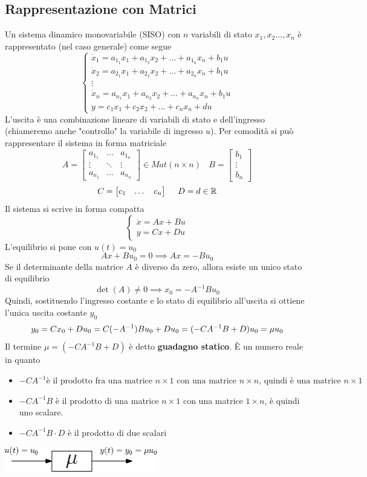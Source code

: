 \documentclass[10pt, letterpaper]{report}
\begin{document}
\subsection{Rappresentazione con Matrici}
Un sistema dinamico monovariabile (SISO) con $n$ variabili di 
stato $x_1,x_2\dots,x_n$ è rappresentato (nel caso generale) come segue
$$\begin{cases}
    \dot{x}_1=a_{1_1}x_1+a_{1_2}x_2+\dots + a_{1_n}x_n+b_1u\\
    \dot{x}_2=a_{2_1}x_1+a_{2_2}x_2+\dots + a_{2_n}x_n+b_1u\\ 
    \vdots \\ 
    \dot{x}_n=a_{n_1}x_1+a_{n_2}x_2+\dots + a_{n_n}x_n+b_1u\\ 
    y=c_1x_1+c_2x_2+\dots + c_nx_n + du
\end{cases}$$
L'uscita è una combinazione lineare di variabili di stato e dell'ingresso (chiameremo anche "controllo" 
la variabile di ingresso $u$). Per comodità si può rappresentare il sistema in forma matriciale 
$$ A=\begin{bmatrix}
    a_{1_1}&\dots& a_{1_n}\\ 
    \vdots &\ddots  &\vdots\\ 
    a_{n_1}&\dots&a_{n_n}
\end{bmatrix}\in Mat(n\times n) \ \ \ \ B=\begin{bmatrix}
    b_1\\ \vdots \\ b_n 
\end{bmatrix}$$
$$ C=\begin{bmatrix}
    c_1&\dots&c_n
\end{bmatrix}\ \ \ \ D = d\in{\mathbb R}$$
Il sistema si scrive in forma compatta 
$$ \begin{cases}
    \dot{x}=Ax+Bu\\ y=Cx+Du
\end{cases}$$
L'equilibrio si pone con $u(t)=u_0$ $$ Ax+Bu_0=0\implies Ax=-Bu_0$$
Se il determinante della matrice $A$ è diverso da zero, allora esiste un unico stato di equilibrio 
$$ \det(A)\ne 0\implies x_0=-A^{-1}Bu_0$$
Quindi, sostituendo l'ingresso costante e lo stato di equilibrio all'uscita si ottiene 
l'unica uscita costante $y_0$
$$y_0=Cx_0+Du_0 = C(-A^{-1})Bu_0+Du_0=\\ 
(-CA^{-1}B+D)u_0=\mu u_0$$
Il termine $\mu=(-CA^{-1}B+D)$ è detto \textbf{guadagno statico}. 
È un numero reale in quanto \begin{itemize}
    \item $-CA^{-1} \text{è il prodotto fra una matrice }n\times 1 \text{ con una matrice $n\times n$, quindi è una matrice }n\times 1
$ \item $-CA^{-1}B$ è il prodotto di una matrice $n\times 1$ con una matrice $1\times n$, è quindi uno scalare.
\item $-CA^{-1}B\cdot D$ è il prodotto di due scalari
\end{itemize}\begin{center}
    \includegraphics[width=0.5\textwidth ]{images/guadagnoStatico.eps}
\end{center}
\end{document}
